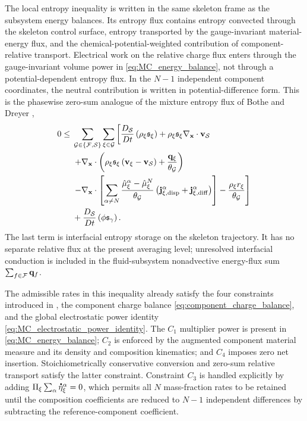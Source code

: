 The local entropy inequality is written in the same skeleton frame as the
subsystem energy balances.  Its entropy flux contains entropy convected through
the skeleton control surface, entropy transported by the gauge-invariant
material-energy flux, and the chemical-potential-weighted contribution
of component-relative transport.  Electrical work on the relative charge flux
enters through the gauge-invariant volume power in
\eqref{eq:MC_energy_balance}, not through a potential-dependent entropy flux.
In the \(N-1\) independent component coordinates, the neutral contribution is
written in potential-difference form.  This is the phasewise zero-sum analogue
of the mixture entropy flux of Bothe and Dreyer
\cite[eq.~(60)]{bothe2015continuum},
%
\begin{align}
	0\le{} &
	\sum_{\mathcal{G}\in\{\mathcal{F},\mathcal{S}\}}
	\sum_{\xi\in\mathcal{G}}
	\left[
		\frac{D_{\mathcal{S}}}{Dt}
		\left(
		\rho_\xi\mathfrak{s}_\xi
		\right)
		+
		\rho_\xi\mathfrak{s}_\xi
		\nabla_{\mathbf{x}}\cdot\mathbf{v}_{\mathcal{S}}
		\right.
	\notag \\
	& \left.
		+
		\nabla_{\mathbf{x}}\cdot
		\left(
		\rho_\xi\mathfrak{s}_\xi
		\left(
		\mathbf{v}_\xi-\mathbf{v}_{\mathcal{S}}
		\right)
		+
		\frac{\mathbf{q}_\xi}{\theta_{\mathcal{G}}}
		\right)
		\right.
	\notag \\
	& \left.
		-
		\nabla_{\mathbf{x}}\cdot
		\left[
		\sum_{\alpha\ne N}
		\frac{\hat\mu_\xi^\alpha-\hat\mu_\xi^N}{\theta_{\mathcal{G}}}
		\left(
		\mathbf{j}_{\xi,{\rm disp}}^\alpha
		+
		\mathbf{j}_{\xi,{\rm diff}}^\alpha
		\right)
		\right]
		-
		\frac{\rho_\xi r_\xi}{\theta_{\mathcal{G}}}
		\right]
	\notag \\
	&+
	\frac{D_{\mathcal{S}}}{Dt}
	\left(
	\phi\mathfrak{s}_\gamma
	\right).
	\label{eq:MC_entropy_inequality}
\end{align}
%
The last term is interfacial entropy storage on the skeleton trajectory.  It has
no separate relative flux at the present averaging level; unresolved
interfacial conduction is included in the fluid-subsystem nonadvective
energy-flux sum \(\sum_{f\in\mathcal{F}}\mathbf{q}_f\).

The admissible rates in this inequality already satisfy the four constraints
introduced in , the component charge balance
\eqref{eq:component_charge_balance}, and the global
electrostatic power identity \eqref{eq:MC_electrostatic_power_identity}.  The
\(C_1\) multiplier power is present in \eqref{eq:MC_energy_balance}; \(C_2\) is
enforced by the augmented component material measure and its density and
composition kinematics; and \(C_4\) imposes zero net insertion.
Stoichiometrically conservative conversion and zero-sum relative transport
satisfy the latter constraint.  Constraint \(C_3\) is handled explicitly by adding
\(\Pi_\xi\sum_\alpha\phasedot\eta_\xi^\alpha=0\), which permits all \(N\)
mass-fraction rates to be retained until the composition coefficients are
reduced to \(N-1\) independent differences by subtracting the
reference-component coefficient.

